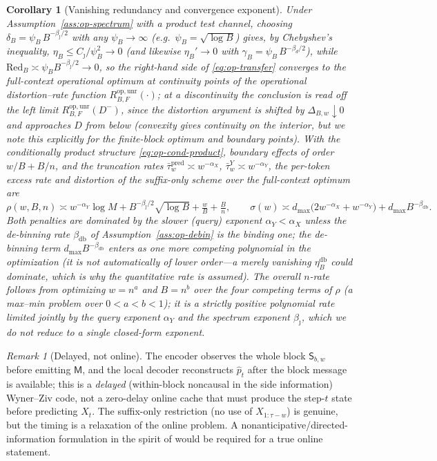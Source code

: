 \documentclass[11pt]{article}
\newcommand{\phat}{\hat{p}}
\theoremstyle{plain}
\newtheorem{corollary}[theorem]{Corollary}
\theoremstyle{definition}
\theoremstyle{remark}
\newtheorem{remark}[theorem]{Remark}
\begin{document}
\begin{corollary}[Vanishing redundancy and convergence exponent]
\label{cor:op-exponent}
Under Assumption~\ref{ass:op-spectrum} with a product test channel,
choosing $\delta_B=\psi_B\,B^{-\beta_\jmath/2}$ with any
$\psi_B\to\infty$ (e.g.\ $\psi_B=\sqrt{\log B}$) gives, by Chebyshev's
inequality, $\eta_B\le C_\jmath/\psi_B^2\to0$ (and likewise
$\eta_B'\to0$ with $\gamma_B=\psi_B\,B^{-\beta_d/2}$), while
$\mathrm{Red}_B\asymp\psi_B B^{-\beta_\jmath/2}\to0$, so the right-hand
side of \eqref{eq:op-transfer} converges to the full-context
operational optimum \emph{at continuity points} of the operational
distortion--rate function $R^{\mathrm{op,unr}}_{B,F}(\cdot)$; at a
discontinuity the conclusion is read off the left limit
$R^{\mathrm{op,unr}}_{B,F}(D^-)$, since the distortion argument is
shifted by $\Delta_{B,w}\downarrow0$ and approaches $D$ from below
(convexity gives continuity on the interior, but we note this
explicitly for the finite-block optimum and boundary points). With the conditionally product structure
\eqref{eq:op-cond-product}, boundary effects of order $w/B+B/n$, and
the truncation rates
$\bar\tau^{\mathrm{pred}}_{w}\asymp w^{-\alpha_X}$,
$\bar\tau^{Y}_{w}\asymp w^{-\alpha_Y}$, the per-token excess rate and
distortion of the suffix-only scheme over the full-context optimum
are
\[
\rho(w,B,n)\asymp w^{-\alpha_Y}\log M+B^{-\beta_\jmath/2}\sqrt{\log B}+\tfrac{w}{B}+\tfrac{B}{n},
\qquad
\sigma(w)\asymp d_{\max}\bigl(2w^{-\alpha_X}+w^{-\alpha_Y}\bigr)+d_{\max}B^{-\beta_{\mathrm{db}}}.
\]
Both penalties are dominated by the slower (query) exponent
$\alpha_Y<\alpha_X$ unless the de-binning rate $\beta_{\mathrm{db}}$ of
Assumption~\ref{ass:op-debin} is the binding one; the de-binning term
$d_{\max}B^{-\beta_{\mathrm{db}}}$ enters as one more competing
polynomial in the optimization (it is \emph{not} automatically of
lower order---a merely vanishing $\eta_B^{\mathrm{db}}$ could dominate,
which is why the quantitative rate is assumed). The overall $n$-rate follows from optimizing
$w=n^a$ and $B=n^b$ over the four competing terms of $\rho$ (a
max--min problem over $0<a<b<1$); it is a strictly positive polynomial
rate limited jointly by the query exponent $\alpha_Y$ and the spectrum
exponent $\beta_\jmath$, which we do not reduce to a single
closed-form exponent.
\end{corollary}

\begin{remark}[Delayed, not online]
\label{rmk:op-online}
The encoder observes the whole block $\mathsf S_{b,w}$ before emitting
$\mathsf M$, and the local decoder reconstructs $\phat_t$ after the
block message is available; this is a \emph{delayed}
(within-block noncausal in the side information) Wyner--Ziv code, not
a zero-delay online cache that must produce the step-$t$ state before
predicting $X_t$. The suffix-only restriction (no use of
$X_{1:\tau-w}$) is genuine, but the timing is a relaxation of the
online problem. A nonanticipative/directed-information formulation in
the spirit of \citet{charalambous2013nonanticipative,tatikonda2009capacity}
would be required for a true online statement.
\end{remark}
\end{document}
